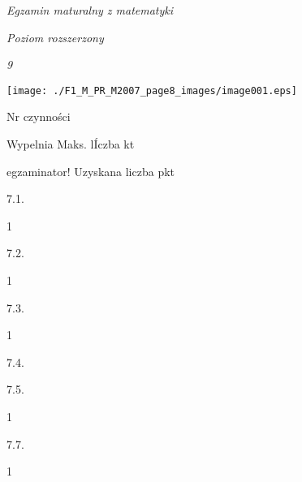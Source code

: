 \documentclass[a4paper,12pt]{article}
\begin{document}
{\it Egzamin maturalny z matematyki}

{\it Poziom rozszerzony}

{\it 9}
\begin{center}
\texttt{[image: ./F1\_M\_PR\_M2007\_page8\_images/image001.eps]}
\end{center}
Nr czynności

Wypelnia Maks. lÍczba kt

egzaminator! Uzyskana liczba pkt

7.1.

1

7.2.

1

7.3.

1

7.4.

7.5.

1

7.7.

1
\end{document}
